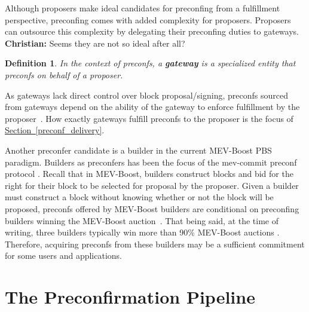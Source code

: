\documentclass[a4paper]{article}
\theoremstyle{boldstyle}
\newtheorem{definitionx}{Definition}
\newenvironment{definition}
  {\begin{defopenboxq}\begin{definitionx}}
  {\end{definitionx}\end{defopenboxq}}
\newcommand{\chm}[1]{\textcolor{OliveGreen}{\textbf{Christian:} #1}}
\begin{document}
        Although proposers make ideal candidates for preconfing from a fulfillment perspective, preconfing comes with added complexity for proposers. Proposers can outsource this complexity by delegating their preconfing duties to gateways. \chm{Seems they are not so ideal after all?}
        \begin{definition}
        \label{def:preconfirmation}
        In the context of preconfs, a \textbf{gateway} is a specialized entity that preconfs on behalf of a proposer.
        \end{definition}
        As gateways lack direct control over block proposal/signing, preconfs sourced from gateways depend on the ability of the gateway to enforce fulfillment by the proposer~\cite{W:ThePreconfirmationGatewayUnlockingPreconfirmations:FromUsertoPreconfer, W:Ahead-of-TimeBlockAuctionsToEnableExecutionPreconfirmations,W:DelegationinBolt:OutsourcingSophisticationWhilePreservingDecentralization}. How exactly gateways fulfill preconfs to the proposer is the focus of \hyperref[preconf_delivery]{Section~\ref{preconf_delivery}}.
        
        Another preconfer candidate is a builder in the current MEV-Boost PBS paradigm. Builders as preconfers has been the focus of the mev-commit preconf protocol \cite{W:Documentation-Understandingmev-commit}.  Recall that in MEV-Boost, builders construct blocks and bid for the right for their block to be selected for proposal by the proposer. Given a builder must construct a block without knowing whether or not the block will be proposed, preconfs offered by MEV-Boost builders are conditional on preconfing builders winning the MEV-Boost auction~\cite{W:PreconfirmationFairExchange,W:LeaderlessandLeader-BasedPreconfirmations}. That being said,
        at the time of writing, three builders typically win more than 90\% MEV-Boost auctions \cite{MEV.pics}. Therefore, acquiring preconfs from these builders may be a sufficient commitment for some users and applications. 
    
\section{The Preconfirmation Pipeline}\label{sec:preconf_pipeline}
\end{document}
